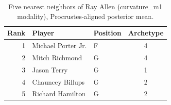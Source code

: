 \begin{table}[htbp]
  \centering\small
  \begin{tabular}{rllc}
    \toprule
    Rank & Player & Position & Archetype \\
    \midrule
    1 & Michael Porter Jr. & F & 4 \\
    2 & Mitch Richmond & G & 4 \\
    3 & Jason Terry & G & 1 \\
    4 & Chauncey Billups & G & 2 \\
    5 & Richard Hamilton & G & 2 \\
    \bottomrule
  \end{tabular}
  \caption{Five nearest neighbors of Ray Allen (curvature_m1 modality), Procrustes-aligned posterior mean.}
  \label{tab:Ray_Allen_neighbors_curvature_m1}
\end{table}

